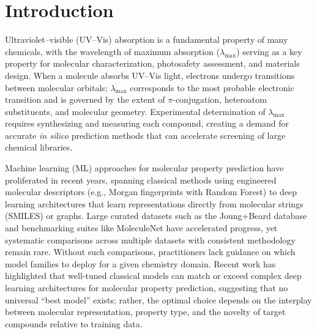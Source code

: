 \section{Introduction}
\label{sec:introduction}

Ultraviolet--visible (UV--Vis) absorption is a fundamental property of many chemicals, with the wavelength of maximum absorption ($\lambda_{\max}$) serving as a key property for molecular characterization, photosafety assessment, and materials design\cite{flemingMolecular2010}.
When a molecule absorbs UV--Vis light, electrons undergo transitions between molecular orbitals; $\lambda_{\max}$ corresponds to the most probable electronic transition and is governed by the extent of $\pi$-conjugation, heteroatom substituents, and molecular geometry\cite{reichardt2011solvents}.
Experimental determination of $\lambda_{\max}$ requires synthesizing and measuring each compound, creating a demand for accurate \textit{in silico} prediction methods that can accelerate screening of large chemical libraries\cite{ghosh2019deep}.

Machine learning (ML) approaches for molecular property prediction have proliferated in recent years, spanning classical methods using engineered molecular descriptors (e.g., Morgan fingerprints\cite{rogers2010extended} with Random Forest\cite{breiman2001random}) to deep learning architectures that learn representations directly from molecular strings (SMILES\cite{weininger1988smiles}) or graphs\cite{gilmer2017neural}.
Large curated datasets such as the Joung+Beard database\cite{joung2020experimental, beard2019comparative} and benchmarking suites like MoleculeNet\cite{wuMoleculeNet2018} have accelerated progress, yet systematic comparisons across multiple datasets with consistent methodology remain rare. Without such comparisons, practitioners lack guidance on which model families to deploy for a given chemistry domain.
Recent work has highlighted that well-tuned classical models can match or exceed complex deep learning architectures for molecular property prediction\cite{panapitiya2022evaluation, walters2021applications}, suggesting that no universal ``best model'' exists; rather, the optimal choice depends on the interplay between molecular representation, property type, and the novelty of target compounds relative to training data.

